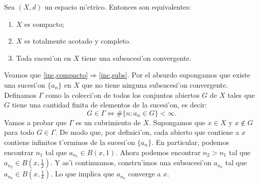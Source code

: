 \begin{teorema}
 Sea $(X,d)$ un  espacio m'etrico. Entonces son
equivalentes:

\begin{enumerate}
\item\label{inc,compacto} $X$ es compacto;
\item\label{inc,toacotadoycomp} $X$ es totalmente acotado y
completo.
\item\label{inc,subs} Toda sucesi'on en $X$ tiene una subsucesi'on convergente.
\end{enumerate}
\end{teorema}
\begin{demo} Veamos que
\ref{inc,compacto}$\Rightarrow$\ref{inc,subs}. Por el absurdo
supongamos que existe una sucesi'on $\{a_n\}$ en $X$ que no tiene
ninguna subsucesi'on convergente. Definamos $\Gamma$ como la
colecci'on de todos los conjuntos abiertos $G$ de $X$ tales que
$G$ tiene una cantidad finita de elementos de la sucesi'on, es
decir:
\[
G\in\Gamma\Leftrightarrow \#\{n:a_n\in G\}<\infty.
\]
Vamos a probar que $\Gamma$ es un cubrimiento de $X$. Supongamos
que $x\in X$ y $x\notin G$ para todo $G\in\Gamma$. De modo que,
por definici'on, cada abierto que contiene a $x$ contiene
infinitos t'erminos de la sucesi'on $\{a_n\}$. En particular,
podemos encontrar $n_1$ tal que $a_{n_1}\in B(x,1)$. Ahora podemos
encontrar $n_2>n_1$ tal que $a_{n_2}\in B(x,\frac12)$. Y as'i
continuamos, constru'imos una subsucesi'on $a_{n_k}$ tal que
$a_{n_k}\in B(x,\frac1k)$. Lo que implica que $a_{n_k}$ converge a
$x$.

\end{demo}
